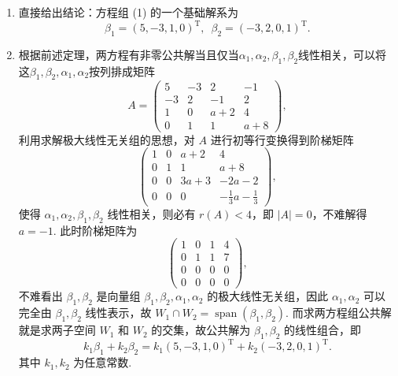 \documentclass[12pt,fontset=fandol]{ctexart}
\begin{document}
\begin{solve}
\begin{enumerate}
        \item 直接给出结论：方程组 (1) 的一个基础解系为
              \[\beta_1=(5,-3,1,0)^{\mathrm{T}},\enspace\beta_2=(-3,2,0,1)^{\mathrm{T}}.\]

        \item 根据前述定理，两方程有非零公共解当且仅当$\alpha_1,\alpha_2,\beta_1,\beta_2$线性相关，可以将这$\beta_1,\beta_2,\alpha_1,\alpha_2$按列排成矩阵
              \[A = \begin{pmatrix}
                      5 & -3 & 2 & -1 \\ -3 & 2 & -1 & 2 \\ 1 & 0 & a+2 & 4 \\ 0 & 1 & 1 & a+8
                  \end{pmatrix},\]
              利用求解极大线性无关组的思想，对 $A$ 进行初等行变换得到阶梯矩阵
              \[\begin{pmatrix}
                      1 & 0 & a+2 & 4 \\ 0 & 1 & 1 & a+8 \\ 0 & 0 & 3a+3 & -2a-2 \\ 0 & 0 & 0 & -\frac{1}{3}a-\frac{1}{3}
                  \end{pmatrix},\]
              使得 $\alpha_1,\alpha_2,\beta_1,\beta_2$ 线性相关，则必有 $r(A) < 4$，即 $|A| = 0$，不难解得 $a = -1$. 此时阶梯矩阵为
              \[\begin{pmatrix}
                      1 & 0 & 1 & 4 \\ 0 & 1 & 1 & 7 \\ 0 & 0 & 0 & 0 \\ 0 & 0 & 0 & 0
                  \end{pmatrix},\]
              不难看出 $\beta_1,\beta_2$ 是向量组 $\beta_1,\beta_2,\alpha_1,\alpha_2$ 的极大线性无关组，因此 $\alpha_1,\alpha_2$ 可以完全由 $\beta_1,\beta_2$ 线性表示，故 $W_1 \cap W_2 = \operatorname{span}(\beta_1,\beta_2)$. 而求两方程组公共解就是求两子空间 $W_1$ 和 $W_2$ 的交集，故公共解为 $\beta_1,\beta_2$ 的线性组合，即
              \[k_1\beta_1 + k_2\beta_2 = k_1(5,-3,1,0)^{\mathrm{T}} + k_2(-3,2,0,1)^{\mathrm{T}}.\]
              其中 $k_1,k_2$ 为任意常数.
    \end{enumerate}
\end{solve}
\end{document}
